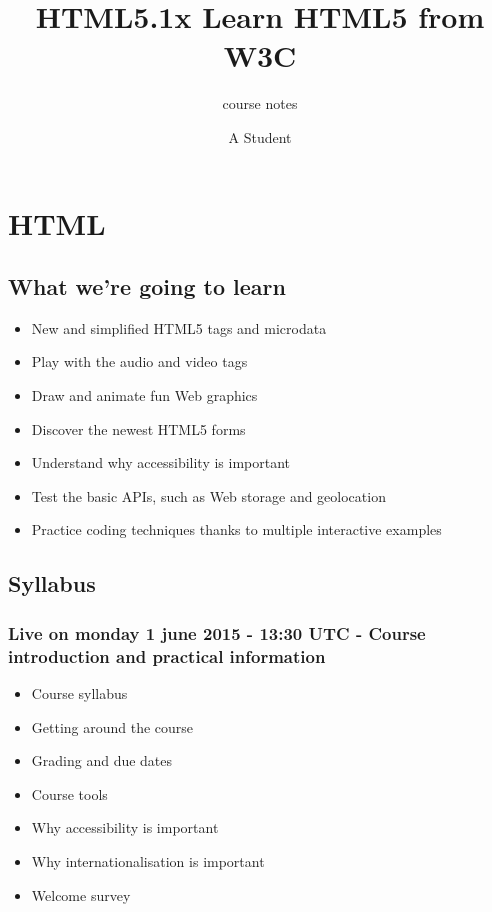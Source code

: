 \documentclass[a4paper,11pt]{book}
\title{HTML5.1x Learn HTML5 from W3C}
\subtitle{course notes}
\author{A Student}
\begin{document}
\maketitle
\tableofcontents

\part{HTML}

\chapter{What we're going to learn}
\begin{itemize}
    \item New and simplified HTML5 tags and microdata
    \item Play with the audio and video tags
    \item Draw and animate fun Web graphics
    \item Discover the newest HTML5 forms
    \item Understand why accessibility is important
    \item Test the basic APIs, such as Web storage and geolocation
    \item Practice coding techniques thanks to multiple interactive examples
\end{itemize}

\chapter{Syllabus}

\section{Live on monday 1 june 2015 - 13:30 UTC - Course introduction and practical information}
\begin{itemize}
    \item Course syllabus
    \item Getting around the course
    \item Grading and due dates
    \item Course tools
    \item Why accessibility is important
    \item Why internationalisation is important
    \item Welcome survey
\end{itemize}
\end{document}
